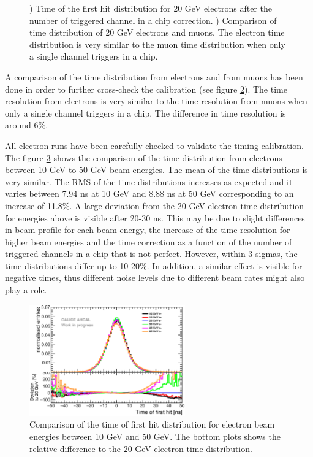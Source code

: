 \begin{figure}[htbp!]
\begin{subfigure}[t]{0.49\textwidth}
		\caption{}\label{fig:timing_electron_muon_comp}
	\end{subfigure}
	\caption{) Time of the first hit distribution for 20 GeV electrons after the number of triggered channel in a chip correction. ) Comparison of time distribution of 20 GeV electrons and muons. The electron time distribution is very similar to the muon time distribution when only a single channel triggers in a chip.}
\end{figure}

A comparison of the time distribution from electrons and from muons has been done in order to further cross-check the calibration (see figure \ref{fig:timing_electron_muon_comp}). The time resolution from electrons is very similar to the time resolution from muons when only a single channel triggers in a chip. The difference in time resolution is around 6\%.

All electron runs have been carefully checked to validate the timing calibration. The figure \ref{fig:all_electron_energies} shows the comparison of the time distribution from electrons between 10 GeV to 50 GeV beam energies. The mean of the time distributions is very similar. The RMS of the time distributions increases as expected and it varies between 7.94 ns at 10 GeV and 8.88 ns at 50 GeV corresponding to an increase of 11.8\%. A large deviation from the 20 GeV electron time distribution for energies above is visible after 20-30 ns. This may be due to slight differences in beam profile for each beam energy, the increase of the time resolution for higher beam energies and the time correction as a function of the number of triggered channels in a chip that is not perfect. However, within 3 sigmas, the time distributions differ up to 10-20\%. In addition, a similar effect is visible for negative times, thus different noise levels due to different beam rates might also play a role.

\begin{figure}[htbp!]
	\centering
	\includegraphics[width=0.6\textwidth]{../Thesis_Plots/Timing/Electrons/Plots/ComparisonDataEnergies.eps}
	\caption{Comparison of the time of first hit distribution for electron beam energies between 10 GeV and 50 GeV. The bottom plots shows the relative difference to the 20 GeV electron time distribution.}
	\label{fig:all_electron_energies}
\end{figure}

